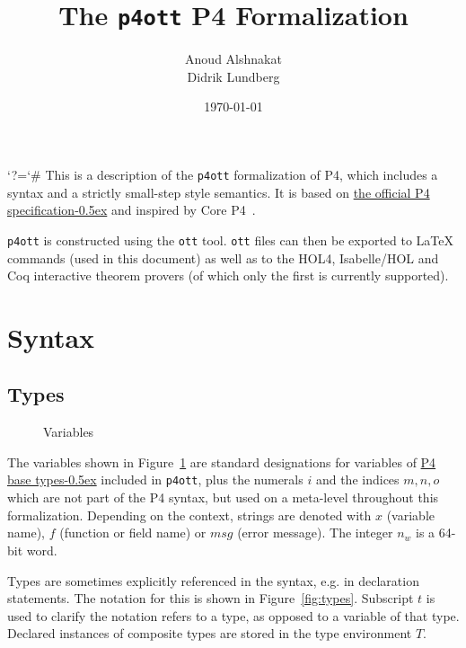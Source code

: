 \documentclass[UTF8]{article}
\title{%
The \texttt{p4ott} P4 Formalization}
\author{Anoud Alshnakat\\
Didrik Lundberg
}
\date{\today}
\begin{document}
\maketitle

\newcommand{\pfott}{\texttt{p4ott}}

\begingroup\lccode`?=`# \lowercase{\endgroup
\newcommand{\specsec}[1]{%
    ?#1%
}
}
\newcommand{\pfourspec}[2]{%
\href{https://p4lang.github.io/p4-spec/docs/P4-16-v1.2.2.html\specsec{#1}}{#2\kern-0.5ex} %
}
\noindent
This is a description of the \pfott{} formalization of P4, which includes a syntax and a strictly small-step style semantics. It is based on \pfourspec{}{the official P4 specification} and inspired by Core P4~\cite{doenges2021petr4}.

\pfott{} is constructed using the \texttt{ott} tool. \texttt{ott} files can then be exported to \LaTeX{} commands (used in this document) as well as to the HOL4, Isabelle/HOL and Coq interactive theorem provers (of which only the first is currently supported).

\section{Syntax}
\subsection{Types}
\newcommand{\num}{\ensuremath{i}}
\newcommand{\vn}{\ensuremath{x}}
\newcommand{\msg}{\ensuremath{\mathit{msg}}}
\newcommand{\fn}{\ensuremath{f}}
\newcommand{\inte}{\ensuremath{n_w}}
%
%
\begin{figure}[h!]
\centering
\ottmetavars
\caption{Variables}
\label{fig:vars}
\end{figure}

The variables shown in Figure~\ref{fig:vars} are standard designations for variables of \pfourspec{sec-base-types}{P4 base types} included in \pfott{}, plus the numerals \num{} and the indices $m, n, o$ which are not part of the P4 syntax, but used on a meta-level throughout this formalization. Depending on the context, strings are denoted with \vn{} (variable name), \fn{} (function or field name) or \msg{} (error message). The integer \inte{} is a 64-bit word.

Types are sometimes explicitly referenced in the syntax, e.g. in declaration statements. The notation for this is shown in Figure~\ref{fig:types}. Subscript $t$ is used to clarify the notation refers to a type, as opposed to a variable of that type. Declared instances of composite types are stored in the type environment $T$.
\end{document}
